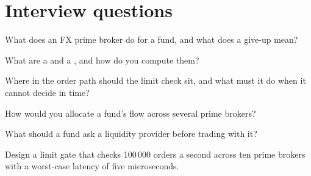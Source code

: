 \section{Interview questions}

\begin{interviewq}\label{iq:m2:getting-access-fx:1}
What does an FX prime broker do for a fund, and what does a give-up mean?
\end{interviewq}

\begin{interviewq}\label{iq:m2:getting-access-fx:2}
What are a  and a , and how do you compute them?
\end{interviewq}

\begin{interviewq}\label{iq:m2:getting-access-fx:3}
Where in the order path should the limit check sit, and what must it do when it cannot
decide in time?
\end{interviewq}

\begin{interviewq}\label{iq:m2:getting-access-fx:4}
How would you allocate a fund's flow across several prime brokers?
\end{interviewq}

\begin{interviewq}\label{iq:m2:getting-access-fx:5}
What should a fund ask a liquidity provider before trading with it?
\end{interviewq}

\begin{interviewq}\label{iq:m2:getting-access-fx:6}
Design a limit gate that checks 100\,000 orders a second across ten prime brokers with
a worst-case latency of five microseconds.
\end{interviewq}
